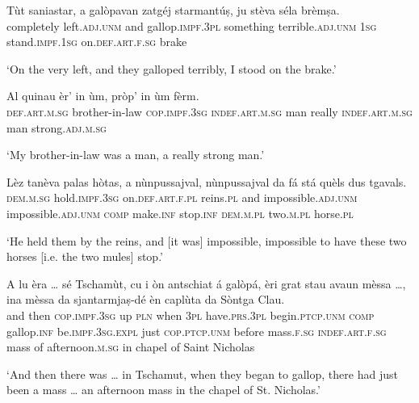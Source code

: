 \begin{linenumbers}
\gll  Tùt saniastar, a galòpavan zatgéj starmantúṣ, ju stèva séla brèmṣa.  \\
 completely left.\textsc{adj.unm} and gallop.\textsc{impf.3pl} something terrible.\textsc{adj.unm} \textsc{1sg} stand.\textsc{impf.1sg} on.\textsc{def.art.f.sg} brake\\
\end{linenumbers}
\medskip
\glt `On the very left, and they galloped terribly, I stood on the brake.'
\medskip

\begin{linenumbers}
\gll   Al quinau èr’ in ùm, pròp’ in ùm fèrm. \\
 \textsc{def.art.m.sg} brother-in-law \textsc{cop.impf.3sg} \textsc{indef.art.m.sg} man really \textsc{indef.art.m.sg} man strong.\textsc{adj.m.sg}  \\
\end{linenumbers}
\medskip
\glt `My brother-in-law was a man, a really strong man.'
\medskip

\begin{linenumbers}
\gll  Lèz tanèva palas hòtas, a nùnpussajval, nùnpussajval da fá stá quèls dus tgavals.  \\
 \textsc{dem.m.sg} hold.\textsc{impf.3sg} on.\textsc{def.art.f.pl} reins.\textsc{pl} and  impossible.\textsc{adj.unm} impossible.\textsc{adj.unm} \textsc{comp} make.\textsc{inf} stop.\textsc{inf}  \textsc{dem.m.pl} two.\textsc{m.pl} horse.\textsc{pl} \\
\end{linenumbers}
\medskip
\glt `He held them by the reins, and [it was] impossible, impossible to have these two horses [i.e. the two mules] stop.'
\medskip

\begin{linenumbers}
\gll  A lu èra … sé Tschamùt, cu i òn antschiat á galòpá, èri grat stau avaun mèssa …, ina mèssa da sjantarmjaṣ-dé èn caplùta da Sòntga Clau.\\
and then \textsc{cop.impf.3sg} {} up \textsc{pln} when \textsc{3pl} have.\textsc{prs.3pl} begin.\textsc{ptcp.unm} \textsc{comp} gallop.\textsc{inf} be.\textsc{impf.3sg.expl} just  \textsc{cop.ptcp.unm} before mass.\textsc{f.sg} {} \textsc{indef.art.f.sg} mass of afternoon.\textsc{m.sg} in chapel of Saint Nicholas  \\
\end{linenumbers}
\medskip
\glt `And then there was … in Tschamut, when they began to gallop, there had just been a mass … an afternoon mass in the chapel of St. Nicholas.'
\medskip

